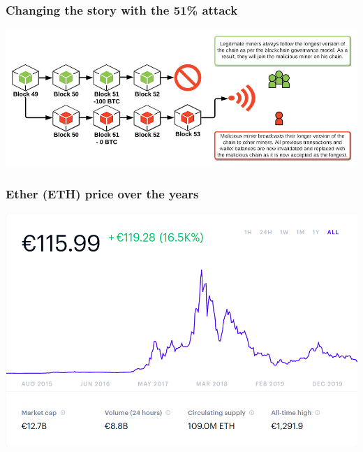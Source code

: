 \documentclass[11pt]{beamer}  %
\begin{document}
\begin{frame}\frametitle{Changing the story with the 51\% attack}

  \begin{center}
    \includegraphics[width=\textwidth,clip=false]{pictures/51-b.png}
  \end{center}

\end{frame}

\begin{frame}\frametitle{Ether (ETH) price over the years}

  \begin{center}
    \includegraphics[scale=0.29,clip=false]{pictures/ethereum.png}
  \end{center}

\end{frame}
\end{document}
